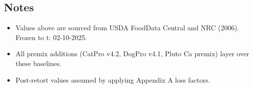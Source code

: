 \subsection*{Notes}
\begin{itemize}
  \item Values above are sourced from USDA FoodData Central and NRC (2006). Frozen to t: 02-10-2025.
  \item All premix additions (CatPro v4.2, DogPro v4.1, Pluto Ca premix) layer over these baselines.
  \item Post-retort values assumed by applying Appendix A loss factors.
\end{itemize}
